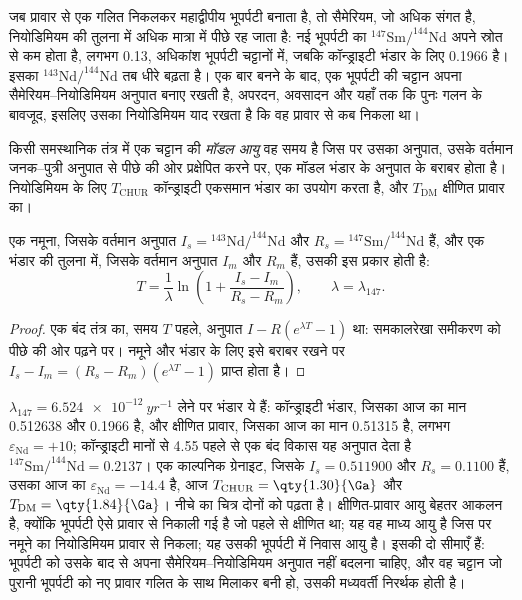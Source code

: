 जब प्रावार से एक गलित निकलकर महाद्वीपीय भूपर्पटी बनाता है, तो सैमेरियम,
जो अधिक संगत है, नियोडिमियम की तुलना में अधिक मात्रा में पीछे रह जाता है: नई भूपर्पटी का
$^{147}\mathrm{Sm}/^{144}\mathrm{Nd}$ अपने स्रोत से कम होता है, लगभग 0.13, अधिकांश
भूपर्पटी चट्टानों में, जबकि कॉन्ड्राइटी भंडार के लिए 0.1966 है। इसका
$^{143}\mathrm{Nd}/^{144}\mathrm{Nd}$ तब धीरे बढ़ता है। एक बार बनने के बाद, एक
भूपर्पटी की चट्टान अपना सैमेरियम--नियोडिमियम अनुपात बनाए रखती है, अपरदन, अवसादन
और यहाँ तक कि पुनः गलन के बावजूद, इसलिए उसका नियोडिमियम याद रखता है
कि वह प्रावार से कब निकला था।

\begin{definition}[मॉडल आयु]\label{def:b3:advanced-geochronology:model-age}
किसी समस्थानिक तंत्र में एक चट्टान की \emph{मॉडल आयु} वह समय है
जिस पर उसका अनुपात, उसके वर्तमान जनक--पुत्री अनुपात से पीछे की ओर प्रक्षेपित करने पर,
एक मॉडल भंडार के अनुपात के बराबर होता है। नियोडिमियम के लिए $T_{\mathrm{CHUR}}$
कॉन्ड्राइटी एकसमान भंडार का उपयोग करता है, और $T_{\mathrm{DM}}$
क्षीणित प्रावार का।
\end{definition}

\begin{theorem}[मॉडल आयु]\label{thm:b3:advanced-geochronology:model-age}
एक नमूना, जिसके वर्तमान अनुपात $I_s = {}^{143}\mathrm{Nd}/^{144}\mathrm{Nd}$ और
$R_s = {}^{147}\mathrm{Sm}/^{144}\mathrm{Nd}$ हैं, और एक भंडार की तुलना में, जिसके
वर्तमान अनुपात $I_m$ और $R_m$ हैं, उसकी  इस प्रकार होती है:
\[
T = \frac1\lambda\ln\left(1 + \frac{I_s - I_m}{R_s - R_m}\right),
\qquad \lambda = \lambda_{147}.
\]
\end{theorem}

\begin{proof}
एक बंद तंत्र का, समय $T$ पहले, अनुपात $I - R(e^{\lambda T} - 1)$ था:
समकालरेखा समीकरण को पीछे की ओर पढ़ने पर। नमूने और भंडार के लिए इसे बराबर रखने पर
$I_s - I_m = (R_s - R_m)(e^{\lambda T} - 1)$ प्राप्त होता है।
\end{proof}

$\lambda_{147} = \qty{6.524e-12}{yr^{-1}}$ लेने पर भंडार ये हैं: कॉन्ड्राइटी भंडार,
जिसका आज का मान 0.512638 और 0.1966 है, और क्षीणित प्रावार, जिसका आज का मान
0.51315 है, लगभग $\varepsilon_{\mathrm{Nd}} = +10$; कॉन्ड्राइटी मानों से
\qty{4.55}{\Ga} पहले से एक बंद विकास यह अनुपात देता है
$^{147}\mathrm{Sm}/^{144}\mathrm{Nd} = 0.2137$। एक काल्पनिक ग्रेनाइट, जिसके
$I_s = 0.511900$ और $R_s = 0.1100$ हैं, उसका आज का $\varepsilon_{\mathrm{Nd}} = -14.4$ है,
आज $T_{\mathrm{CHUR}} = \qty{1.30}{\Ga}$ और $T_{\mathrm{DM}} =
\qty{1.84}{\Ga}$। नीचे का चित्र दोनों को पढ़ता है। क्षीणित-प्रावार आयु बेहतर आकलन है,
क्योंकि भूपर्पटी ऐसे प्रावार से निकाली गई है जो पहले से क्षीणित था;
यह वह माध्य आयु है जिस पर नमूने का नियोडिमियम प्रावार से निकला;
यह उसकी भूपर्पटी में निवास आयु है। इसकी दो सीमाएँ हैं: भूपर्पटी को उसके बाद से
अपना सैमेरियम--नियोडिमियम अनुपात नहीं बदलना चाहिए, और वह चट्टान जो
पुरानी भूपर्पटी को नए प्रावार गलित के साथ मिलाकर बनी हो, उसकी मध्यवर्ती  निरर्थक होती है।

